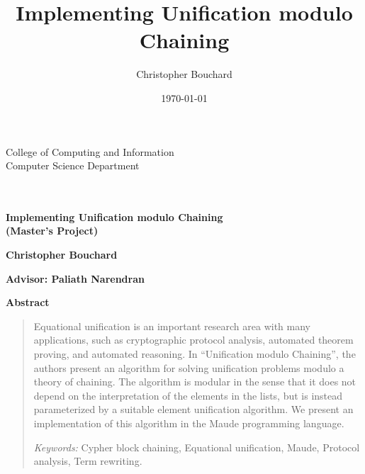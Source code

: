 \documentclass[11pt]{article}
\title{Implementing Unification modulo Chaining}
\author{Christopher Bouchard}
\date{\today}
\begin{document}
\begin{titlepage}
    {\vspace*{-1in}\hspace*{-.5in}
    \parbox{7.25in}{
    \setlength{\baselineskip}{13pt}
    \makebox{\ } \hfill {\footnotesize College of Computing and Information} \\
    \makebox{\ } \hfill {\footnotesize Computer Science Department} \\
    \makebox{\ } \\
    \\
    }
    \vspace{-.95in}}

    \epsfxsize=3.15in
    \epsfclipon

    \vspace*{2in}

    \begin{center}
        \textbf{\huge Implementing Unification modulo Chaining} \\[+15pt]
        \textbf{(Master's Project)}
        \par
    \end{center}

    \vspace{2in}

    \begin{center}
    \textbf{\large Christopher Bouchard}\\

    \par\end{center}{\large \par}

    \begin{center}
    \textbf{\large \vspace{0.5in}
    Advisor: Paliath Narendran }\textbf{ }
    \par\end{center}
\end{titlepage}

\begin{center}
    \textbf{Abstract}
\end{center}
\begin{quotation}
Equational unification is an important research area with many applications,
such as cryptographic protocol analysis, automated theorem proving, and
automated reasoning. In ``Unification modulo Chaining'', the authors present an
algorithm for solving unification problems modulo a theory of chaining. The
algorithm is modular in the sense that it does not depend on the interpretation
of the elements in the lists, but is instead parameterized by a suitable
element unification algorithm. We present an implementation of this algorithm
in the Maude programming language.

\medskip{}
\textit{Keywords:} Cypher block chaining, Equational unification, Maude, Protocol
analysis, Term rewriting.
\end{quotation}
\end{document}
